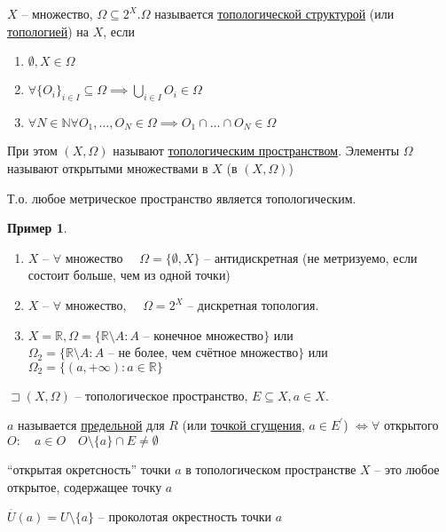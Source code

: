 \documentclass{book}
\newcommand\N{\ensuremath{\mathbb{N}}}
\newcommand\R{\ensuremath{\mathbb{R}}}
\renewcommand\O{\ensuremath{\emptyset}}
\newcommand{\p}[1]{#1^{\prime}}
\theoremstyle{definition}
\newtheorem*{example}{Пример}
\begin{document}
\begin{definition}
    $ $\\$X$ -- множество,  $\Omega \subseteq 2^X. \Omega$ называется \underline{топологической структурой} (или \underline{топологией}) на $X$, если
     \begin{enumerate}
        \item $\O , X\in \Omega$
        \item $\forall \{O_i\}_{i\in I} \subseteq \Omega \implies  \bigcup\limits_{i \in  I} O_i \in \Omega$
        \item $\forall N\in \N \forall O_1, \ldots, O_N \in \Omega \implies  O_1\cap \ldots\cap O_N \in \Omega$
    \end{enumerate} 

    При этом $(X, \Omega)$ называют \underline{топологическим пространством}. Элементы  $\Omega$ называют открытыми множествами в  $X$ (в  $(X, \Omega)$)

    Т.о. любое метрическое пространство является топологическим.
\end{definition}

\begin{example}
   \begin{enumerate}
       \item $X$ --  $\forall $ множество $\quad \Omega = \{\O , X\}$ -- антидискретная (не метризуемо, если состоит больше, чем из одной точки)
       \item $X$ --  $\forall $ множество, $\quad \Omega = 2^X$ -- дискретная топология.
       \item $X = \R, \Omega = \{\R\setminus A: A \text{ -- конечное множество}\}$ или $\Omega_2 = \{\R\setminus A: A\text{ -- не более, чем счётное множество}\}$ или $\Omega_2 = \{(a, +\infty ):a\in \R\}$
   \end{enumerate} 
\end{example}

\begin{definition}
    $\sqsupset (X, \Omega)$ -- топологическое пространство, $E\subseteq X, a\in X$.

    $a$ называется \underline{предельной}  для $R$ (или \underline{точкой сгущения}, $a\in \p E$) $\iff \forall $ открытого $O:\quad a\in O\quad O\setminus \{a\}\cap E\neq \O $

    ``открытая окретсность'' точки $a$ в топологическом пространстве $X$ -- это любое открытое, содержащее точку  $a$

    $\overset{\cdot } U(a) = U\setminus \{a\}$ -- проколотая окрестность точки $ a$
\end{definition}
\end{document}
